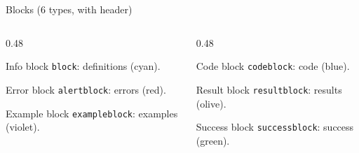 \documentclass[sans,numeric,titlesplit]{qslides}
\begin{document}
\begin{frame}{Blocks (6 types, with header)}
  \begin{columns}[onlytextwidth,T]
    \begin{column}{0.48\linewidth}
      \begin{block}{Info block}
        \texttt{block}: definitions (cyan).
      \end{block}
      \begin{alertblock}{Error block}
        \texttt{alertblock}: errors (red).
      \end{alertblock}
      \begin{exampleblock}{Example block}
        \texttt{exampleblock}: examples (violet).
      \end{exampleblock}
    \end{column}
    \begin{column}{0.48\linewidth}
      \begin{codeblock}{Code block}
        \texttt{codeblock}: code (blue).
      \end{codeblock}
      \begin{resultblock}{Result block}
        \texttt{resultblock}: results (olive).
      \end{resultblock}
      \begin{successblock}{Success block}
        \texttt{successblock}: success (green).
      \end{successblock}
    \end{column}
  \end{columns}
\end{frame}
\end{document}
